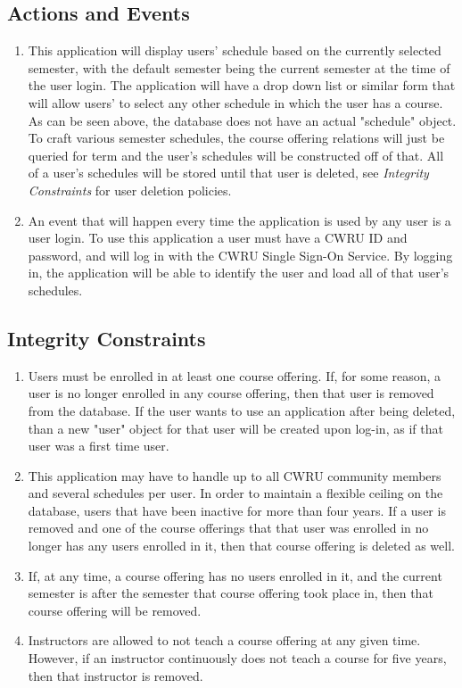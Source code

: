 \documentclass[pdftex,12pt,letter]{article}
\begin{document}
\subsection*{Actions and Events}
\begin{enumerate}[1.]
\item This application will display users' schedule based on the currently selected semester, with the default semester being the current semester at the time of the user login. The application will have a drop down list or similar form that will allow users' to select any other schedule in which the user has a course. As can be seen above, the database does not have an actual "schedule" object. To craft various semester schedules, the course offering relations will just be queried for term and the user's schedules will be constructed off of that. All of a user's schedules will be stored until that user is deleted, see \textit{Integrity Constraints} for user deletion policies.
\item An event that will happen every time the application is used by any user is a user login. To use this application a user must have a CWRU ID and password, and will log in with the CWRU Single Sign-On Service. By logging in, the application will be able to identify the user and load all of that user's schedules.
\end{enumerate}
\subsection*{Integrity Constraints}
\begin{enumerate}
\item Users must be enrolled in at least one course offering. If, for some reason, a user is no longer enrolled in any course offering, then that user is removed from the database. If the user wants to use an application after being deleted, than a new "user" object for that user will be created upon log-in, as if that user was a first time user.
\item This application may have to handle up to all CWRU community members and several schedules per user. In order to maintain a flexible ceiling on the database, users that have been inactive for more than four years. If a user is removed and one of the course offerings that that user was enrolled in no longer has any users enrolled in it, then that course offering is deleted as well.
\item If, at any time, a course offering has no users enrolled in it, and the current semester is after the semester that course offering took place in, then that course offering will be removed.
\item Instructors are allowed to not teach a course offering at any given time. However, if an instructor continuously does not teach a course for five years, then that instructor is removed.
\end{enumerate}
\end{document}
